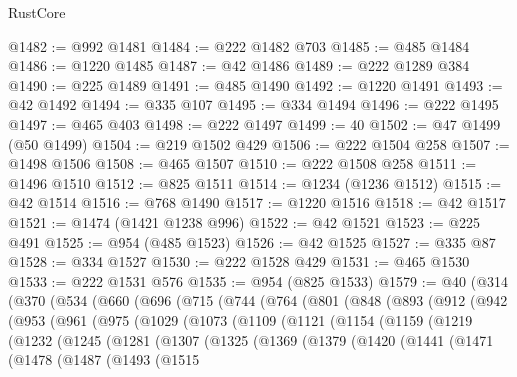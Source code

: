 \begin{lexlean}{RustCore}
\begin{coremodule}
@1482 := @992 @1481
@1484 := @222 @1482 @703
@1485 := @485 @1484
@1486 := @1220 @1485
@1487 := @42 @1486
@1489 := @222 @1289 @384
@1490 := @225 @1489
@1491 := @485 @1490
@1492 := @1220 @1491
@1493 := @42 @1492
@1494 := @335 @107
@1495 := @334 @1494
@1496 := @222 @1495
@1497 := @465 @403
@1498 := @222 @1497
@1499 := 40
@1502 := @47 @1499 (@50 @1499)
@1504 := @219 @1502 @429
@1506 := @222 @1504 @258
@1507 := @1498 @1506
@1508 := @465 @1507
@1510 := @222 @1508 @258
@1511 := @1496 @1510
@1512 := @825 @1511
@1514 := @1234 (@1236 @1512)
@1515 := @42 @1514
@1516 := @768 @1490
@1517 := @1220 @1516
@1518 := @42 @1517
@1521 := @1474 (@1421 @1238 @996)
@1522 := @42 @1521
@1523 := @225 @491
@1525 := @954 (@485 @1523)
@1526 := @42 @1525
@1527 := @335 @87
@1528 := @334 @1527
@1530 := @222 @1528 @429
@1531 := @465 @1530
@1533 := @222 @1531 @576
@1535 := @954 (@825 @1533)
@1579 := @40
    (@314
      (@370
        (@534
          (@660
            (@696
              (@715
                (@744
                  (@764
                    (@801
                      (@848
                        (@893
                          (@912
                            (@942
                              (@953
                                (@961
                                  (@975
                                    (@1029
                                      (@1073
                                        (@1109
                                          (@1121
                                            (@1154
                                              (@1159
                                                (@1219
                                                  (@1232
                                                    (@1245
                                                      (@1281
                                                        (@1307
                                                          (@1325
                                                            (@1369
                                                              (@1379
                                                                (@1420
                                                                  (@1441
                                                                    (@1471
                                                                      (@1478
                                                                        (@1487
                                                                          (@1493
                                                                            (@1515

\end{coremodule}
\end{lexlean}
